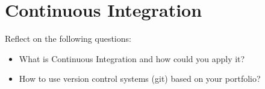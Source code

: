 
\section{Continuous Integration}
Reflect on the following questions:
\begin{itemize}
    \item What is Continuous Integration and how could you apply it?
    \item How to use version control systems (git) based on your portfolio?
\end{itemize}
